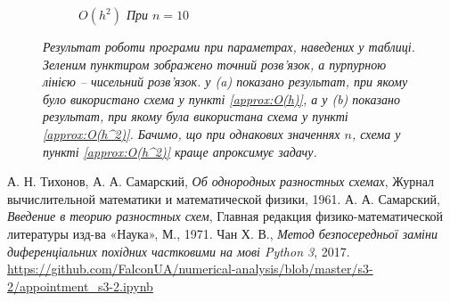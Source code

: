 \begin{figure}[h!]
\begin{subfigure}{.5\textwidth}
  \caption{\it \(O(h^2)\) При \(n = 10\)}
  \label{fig:sub2}
\end{subfigure}
\caption{{\it Результат роботи програми \cite{SourceCode} при параметрах, наведених у таблиці. Зеленим пунктиром зображено точний розв'язок, а пурпурною лінією -- чисельний розв'язок. у (a) показано результат, при якому було використано схема у пункті \ref{approx:O(h)}, а у (b) показано результат, при якому була використана схема у пункті \ref{approx:O(h^2)}. Бачимо, що при однакових значеннях \( n\), схема у пункті \ref{approx:O(h^2)} краще апроксимує задачу.}}
\label{fig:res3}
\end{figure}


\newpage
\begin{thebibliography}{9}

  А. Н. Тихонов, А. А. Самарский,
  \emph{Об однородных разностных схемах},
  Журнал вычислительной математики и математической физики, 1961.
  А. А. Самарский,
  \emph{Введение в теорию разностных схем},
  Главная редакция физико-математической литературы изд-ва «Наука», 
  М., 1971. 
  Чан Х. В., \emph{Метод безпосередньої заміни диференціальних похідних частковими на мові Python 3}, 2017. 
  \url{https://github.com/FalconUA/numerical-analysis/blob/master/s3-2/appointment_s3-2.ipynb}

\end{thebibliography}
